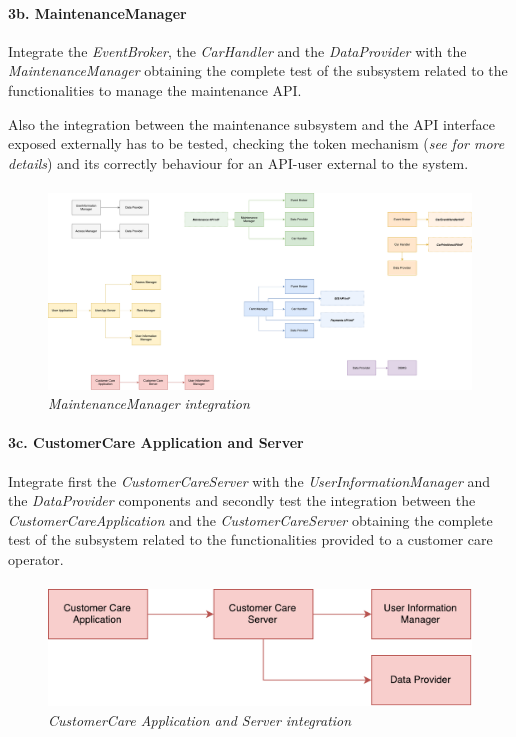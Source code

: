 \paragraph{3b. MaintenanceManager} 
Integrate the \emph{EventBroker}, the \emph{CarHandler} and the \emph{DataProvider} with the \emph{MaintenanceManager} obtaining the complete test of the subsystem related to the functionalities to manage the maintenance API.

Also the integration between the maintenance subsystem and the API interface exposed externally has to be tested, checking the token mechanism (\emph{see \cite{DD} for more details}) and its correctly behaviour for an API-user external to the system.
\paragraph{}
		
		\begin{figure}[h]
			\centering
			\includegraphics[width=0.8\linewidth]{img/Integration3b}
			\caption{
				\label{fig:maintenanceManager} 
				\emph{MaintenanceManager integration}
			}
		\end{figure}

\paragraph{3c. CustomerCare Application and Server} 
Integrate first the \emph{CustomerCareServer} with the \emph{UserInformationManager} and the \emph{DataProvider} components  and secondly test the integration between the \emph{CustomerCareApplication} and the \emph{CustomerCareServer} obtaining the complete test of the subsystem related to the functionalities provided to a customer care operator.
\paragraph{}
		
		\begin{figure}[h]
			\centering
			\includegraphics[width=0.8\linewidth]{img/Integration3c}
			\caption{
				\label{fig:ccAppServer} 
				\emph{CustomerCare Application and Server integration}
			}
		\end{figure}

